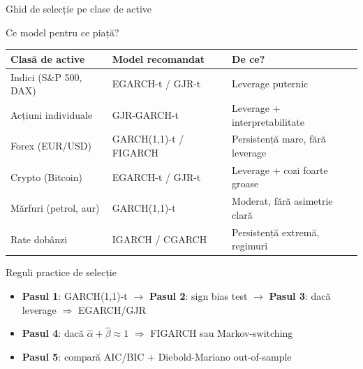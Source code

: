 \documentclass[9pt, aspectratio=169, t]{beamer}
\begin{document}
\begin{frame}{Ghid de selecție pe clase de active}
    \small
        \vspace{-0.2cm}
        \begin{block}{Ce model pentru ce piață?}
            {\footnotesize
            \renewcommand{\arraystretch}{1.15}
            \begin{center}
            \begin{tabular}{lll}
                \toprule
                \textbf{Clasă de active} & \textbf{Model recomandat} & \textbf{De ce?} \\
                \midrule
                Indici (S\&P 500, DAX) & EGARCH-t / GJR-t & Leverage puternic \\
                Acțiuni individuale & GJR-GARCH-t & Leverage + interpretabilitate \\
                Forex (EUR/USD) & GARCH(1,1)-t / FIGARCH & Persistență mare, fără leverage \\
                Crypto (Bitcoin) & EGARCH-t / GJR-t & Leverage + cozi foarte groase \\
                Mărfuri (petrol, aur) & GARCH(1,1)-t & Moderat, fără asimetrie clară \\
                Rate dobânzi & IGARCH / CGARCH & Persistență extremă, regimuri \\
                \bottomrule
            \end{tabular}
            \end{center}}
        \end{block}
        \vspace{-1mm}
        \begin{alertblock}{Reguli practice de selecție}
            \begin{itemize}\setlength{\itemsep}{0pt}
                \item \textbf{Pasul 1}: GARCH(1,1)-t $\rightarrow$ \textbf{Pasul 2}: sign bias test $\rightarrow$ \textbf{Pasul 3}: dacă leverage $\Rightarrow$ EGARCH/GJR
                \item \textbf{Pasul 4}: dacă $\hat{\alpha}+\hat{\beta} \approx 1$ $\Rightarrow$ FIGARCH sau Markov-switching
                \item \textbf{Pasul 5}: compară AIC/BIC + Diebold-Mariano out-of-sample
            \end{itemize}
        \end{alertblock}
\end{frame}
\end{document}
